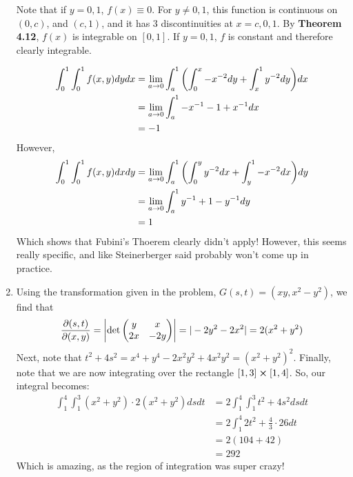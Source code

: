 \documentclass[12pt]{article}
\theoremstyle{definition}
\theoremstyle{remark}
\begin{document}
\begin{enumerate}[leftmargin=\labelsep]
		Note that if $y = 0, 1$, $f(x) \equiv 0$. For $y \neq 0, 1$, this function is continuous on $(0, c)$, and $(c, 1)$, and it has 3 discontinuities at $x=c, 0, 1$. By \textbf{Theorem 4.12}, $f(x)$ is integrable on $[0, 1]$. If $y = 0, 1$, $f$ is constant and therefore clearly integrable. 
		
		\begin{align*}
			\int_0^1 \int_0^1 f(x, y)dydx &= \lim_{a \to 0} \int_a^1 \qty(\int_0^x -x^{-2}dy + \int_x^1 y^{-2}dy)dx \\
			&= \lim_{a \to 0} \int_a^1 -x^{-1} - 1 + x^{-1} dx \\
			&= -1
		\end{align*}
		However, 
		\begin{align*}
			\int_0^1 \int_0^1 f(x, y)dxdy &= \lim_{a \to 0} \int_a^1 \qty(\int_0^y y^{-2}dx + \int_y^1 -x^{-2}dx)dy \\
			&= \lim_{a \to 0} \int_a^1 y^{-1} + 1 - y^{-1} dy \\
			&= 1
		\end{align*}
		Which shows that Fubini's Thoerem clearly didn't apply! However, this seems really specific, and like Steinerberger said probably won't come up in practice.
		
		\item 
		Using the transformation given in the problem, $G(s, t) = (xy, x^2-y^2)$, we find that 
		\begin{align*}
			\frac{\partial (s, t)}{\partial (x, y)} = \qty|\det\begin{pmatrix}
			y & x \\
			2x & -2y
		\end{pmatrix}| = |-2y^2-2x^2| = 2(x^2+y^2)
		\end{align*}
		Next, note that $t^2+4s^2=x^4+y^4-2x^2y^2+4x^2y^2=(x^2+y^2)^2$. Finally, note that we are now integrating over the rectangle $[1, 3] \cross [1, 4]$. So, our integral becomes:
		\begin{align*}
			\int_1^4 \int_1^3 (x^2+y^2) \cdot 2(x^2+y^2)dsdt &= 2\int_1^4 \int_1^3 t^2+4s^2 dsdt \\
			&= 2\int_1^4 2t^2 + \frac 43 \cdot 26 dt \\
			&= 2(104 + 42) \\
			&= 292
		\end{align*}
		Which is amazing, as the region of integration was super crazy!
		

\end{enumerate}
\end{document}
